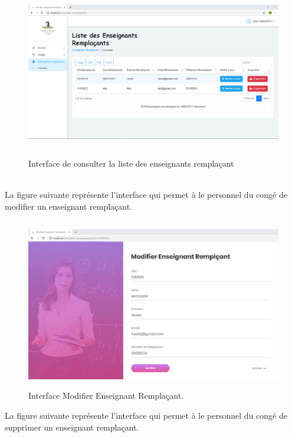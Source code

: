\documentclass[12 pt ]{report}
\begin{document}
\begin{figure}[h]
 \begin{center}
\includegraphics[width= 18 cm ,height=7.5cm]{consulter_remplacant.PNG}
\caption{Interface de consulter la liste des  enseignants remplaçant }

\end{center}
\end{figure} \\
La figure suivante représente l'interface qui permet à le personnel du congé de modifier un enseignant remplaçant.
\begin{figure}[h]
 \begin{center}
\includegraphics[width= 18 cm ,height=7.5cm]{modifier_remplacant.PNG}
\caption{Interface  Modifier Enseignant Remplaçant. }

\end{center}
\end{figure}
\newpage
La figure suivante représente l'interface qui permet à le personnel du congé de supprimer un enseignant remplaçant.
\end{document}
